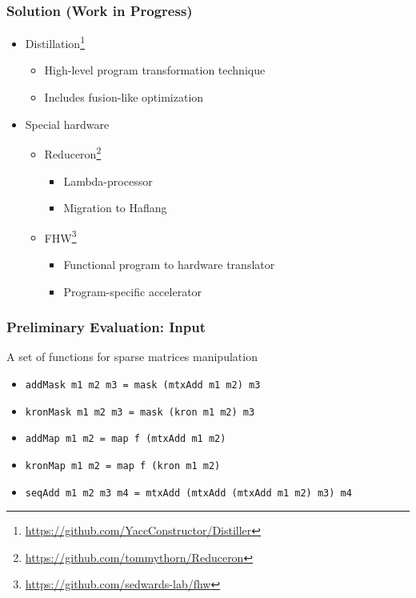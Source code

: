 \documentclass[xcolor=table,aspectratio=169]{beamer}
\begin{document}
\begin{frame}[fragile]
  \frametitle{Solution (Work in Progress)}  
  \begin{itemize}
  \item Distillation\footnote{\href{https://github.com/YaccConstructor/Distiller}{https://github.com/YaccConstructor/Distiller}} 
  \begin{itemize}
    \item High-level program transformation technique
    \item Includes fusion-like optimization
  \end{itemize} 
  \pause
  \item Special hardware
  \begin{itemize}
    \item Reduceron\footnote{\href{https://github.com/tommythorn/Reduceron}{https://github.com/tommythorn/Reduceron}}
    \begin{itemize}
      \item Lambda-processor
      \item Migration to Haflang
    \end{itemize}
    \item FHW\footnote{\href{https://github.com/sedwards-lab/fhw}{https://github.com/sedwards-lab/fhw}}
    \begin{itemize}
      \item Functional program to hardware translator
      \item Program-specific accelerator
    \end{itemize}
  \end{itemize}
  \end{itemize}
\end{frame}

\begin{frame}[fragile]
  \frametitle{Preliminary Evaluation: Input}
  A set of functions for sparse matrices manipulation  
    \begin{itemize}
      \item \verb|addMask m1 m2 m3 = mask (mtxAdd m1 m2) m3|
      \item \verb|kronMask m1 m2 m3 = mask (kron m1 m2) m3 |   
      \item \verb|addMap m1 m2 = map f (mtxAdd m1 m2)|
      \item \verb|kronMap m1 m2 = map f (kron m1 m2)|
      \item \verb|seqAdd m1 m2 m3 m4 = mtxAdd (mtxAdd (mtxAdd m1 m2) m3) m4|              
    \end{itemize}
\end{frame}
\end{document}

